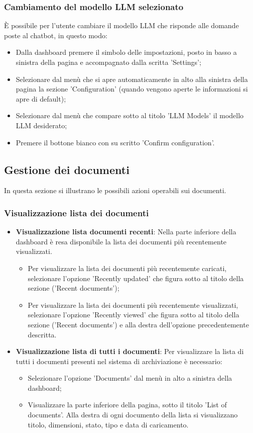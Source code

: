 \documentclass[10pt, a4paper]{article}
\begin{document}
\subsubsection{Cambiamento del modello LLM selezionato}
È possibile per l'utente cambiare il modello LLM che risponde alle domande poste al chatbot, in questo modo:
\begin{itemize}
    \item Dalla dashboard premere il simbolo delle impostazioni, posto in basso a sinistra della pagina e accompagnato dalla scritta 'Settings';
    \item Selezionare dal menù che si apre automaticamente in alto alla sinistra della pagina la sezione 'Configuration' (quando vengono aperte le informazioni si apre di default);
    \item Selezionare dal menù che compare sotto al titolo 'LLM Models' il modello LLM desiderato;
    \item Premere il bottone bianco con su scritto 'Confirm configuration'.
\end{itemize}

\subsection{Gestione dei documenti}
In questa sezione si illustrano le possibili azioni operabili sui documenti.
\subsubsection{Visualizzazione lista dei documenti}
\begin{itemize}
    \item \textbf{Visualizzazione lista documenti recenti}: Nella parte inferiore della dashboard è resa disponibile la lista dei documenti più recentemente visualizzati.
    \begin{itemize}
        \item Per visualizzare la lista dei documenti più recentemente caricati, selezionare l'opzione 'Recently updated' che figura sotto al titolo della sezione ('Recent documents');
        \item Per visualizzare la lista dei documenti più recentemente visualizzati, selezionare l'opzione 'Recently viewed' che figura sotto al titolo della sezione ('Recent documents') e alla destra dell'opzione precedentemente descritta.
    \end{itemize}
    \item \textbf{Visualizzazione lista di tutti i documenti}: Per visualizzare la lista di tutti i documenti presenti nel sistema di archiviazione è necessario:
    \begin{itemize}
        \item Selezionare l'opzione 'Documents' dal menù in alto a sinistra della dashboard;
        \item Visualizzare la parte inferiore della pagina, sotto il titolo 'List of documents'. Alla destra di ogni documento della lista si visualizzano titolo, dimensioni, stato, tipo e data di caricamento.
    \end{itemize}
\end{itemize}
\end{document}
